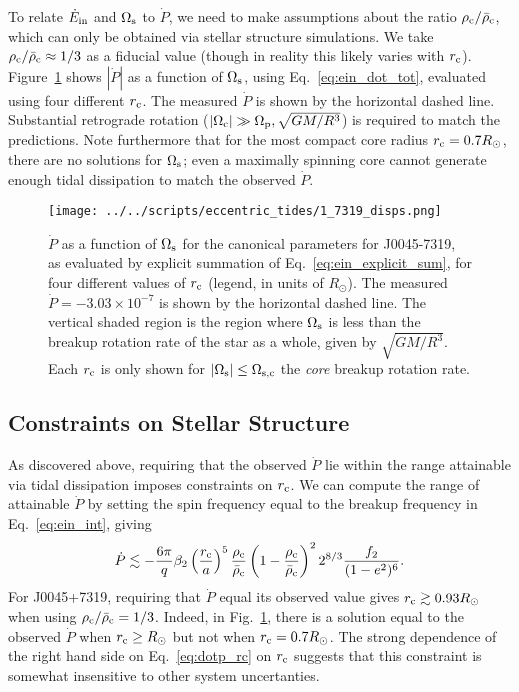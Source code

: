 \documentclass[
        fleqn,
        usenatbib,
    ]{mnras}
\newcommand*{\abs}[1]{\left|#1\right|}
\begin{document}
To relate $\dot{E}_{\rm in}$ and $\Omega_{\rm s}$ to $\dot{P}$, we need to make
assumptions about the ratio $\rho_{\rm c} / \bar{\rho}_{\rm c}$, which can only
be obtained via stellar structure simulations. We take $\rho_{\rm c} /
\bar{\rho}_{\rm c} \approx 1/3$ as a fiducial value (though in reality this
likely varies with $r_{\rm c}$). Figure~\ref{fig:j0045_fid} shows
$\abs{\dot{P}}$ as a function of $\Omega_{\rm s}$, using
Eq.~\eqref{eq:ein_dot_tot}, evaluated using four different $r_{\rm c}$. The
measured $\dot{P}$ is shown by the horizontal dashed line. Substantial
retrograde rotation ($\abs{\Omega_{\rm c}} \gg \Omega_{\rm p},
\sqrt{GM/R^3}$) is required to match the predictions. Note furthermore that for the
most compact core radius $r _{\rm c} = 0.7R_{\odot}$, there are no solutions for
$\Omega_{\rm s}$; even a maximally spinning core cannot generate enough tidal
dissipation to match the observed $\dot{P}$.
\begin{figure}
    \centering
    \texttt{[image: ../../scripts/eccentric\_tides/1\_7319\_disps.png]}
    \caption{$\dot{P}$ as a function of $\Omega_{\rm s}$ for the canonical
    parameters for J0045-7319, as evaluated by explicit summation of
    Eq.~\eqref{eq:ein_explicit_sum}, for four different values of $r_{\rm c}$
    (legend, in units of $R_{\odot}$). The measured $\dot{P} = -3.03\times
    10^{-7}$ is shown by the horizontal dashed line. The vertical shaded region
    is the region where $\Omega_{\rm s}$ is less than the breakup rotation rate
    of the star as a whole, given by $\sqrt{GM / R^3}$. Each $r_{\rm c}$ is only
    shown for $\abs{\Omega_{\rm s}} \leq \Omega_{\rm s, c}$ the \emph{core}
    breakup rotation rate.
    }\label{fig:j0045_fid}
\end{figure}

\subsection{Constraints on Stellar Structure}

As discovered above, requiring that the observed $\dot{P}$ lie within the
range attainable via tidal dissipation imposes constraints on $r_{\rm c}$. We
can compute the range of attainable $\dot{P}$ by setting the spin frequency
equal to the breakup frequency in Eq.~\eqref{eq:ein_int}, giving
\begin{equation}
    \dot{P} \lesssim
        -\frac{6\pi}{q}\beta_2 \left(\frac{r_{\rm c}}{a}\right)^5
        \frac{\rho_{\rm c}}{\bar{\rho}_{\rm c}} \left(1 -
        \frac{\rho_{\rm c}}{\bar{\rho}_{\rm c}}\right)^2 2^{8/3}\frac{f_2}{(1 -
        e^2)^6}.\label{eq:dotp_rc}
\end{equation}
For J0045+7319, requiring that $\dot{P}$ equal its observed value gives $r_{\rm
c} \gtrsim 0.93R_{\odot}$ when using $\rho_{\rm c} / \bar{\rho}_{\rm c} = 1/3$.
Indeed, in Fig.~\ref{fig:j0045_fid}, there is a solution equal to the observed
$\dot{P}$ when $r_{\rm c} \geq R_{\odot}$ but not when $r_{\rm c} =
0.7R_{\odot}$. The strong dependence of the right hand side on
Eq.~\eqref{eq:dotp_rc} on $r_{\rm c}$ suggests that this constraint is somewhat
insensitive to other system uncertanties.
\end{document}
